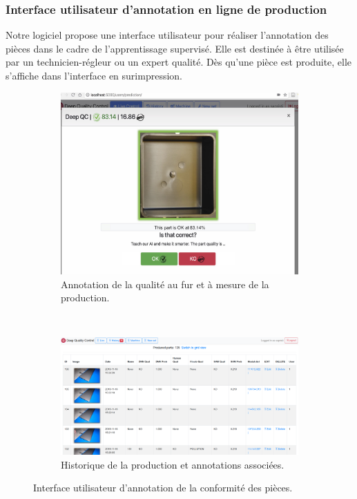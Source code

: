 \subsubsection{Interface utilisateur d'annotation en ligne de production} \label{subsubsec:hmi}
Notre logiciel propose une interface utilisateur pour réaliser l'annotation des pièces dans le cadre de l'apprentissage supervisé.
Elle est destinée à être utilisée par un technicien-régleur ou un expert qualité.
Dès qu'une pièce est produite, elle s'affiche dans l'interface en surimpression.

\begin{figure}[hb!]
	\centering
	\begin{subfigure}[c]{0.60\textwidth}
		\includegraphics[width=\textwidth]{../Chap5/Figures/annotation_hmi.jpg}
		\caption{Annotation de la qualité au fur et à mesure de la production.}
	\end{subfigure}
	\\
	\bigskip
	\begin{subfigure}[c]{0.60\textwidth}
		\includegraphics[width=\textwidth,height=\textheight,keepaspectratio]{../Chap5/Figures/Capture-2018-11-21-15-10-59.png}
		\caption{Historique de la production et annotations associées.}
		\vspace*{5mm}
	\end{subfigure}
	\caption{Interface utilisateur d'annotation de la conformité des pièces.}
	\label{fig:hmi}
\end{figure}

